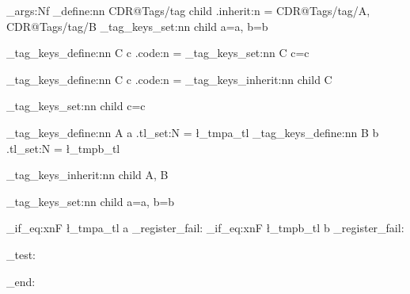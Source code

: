 \exp_args:Nf \keys_define:nn { CDR@Tags/tag } {
  child .inherit:n = { CDR@Tags/tag/A, CDR@Tags/tag/B}
}
\CDR_tag_keys_set:nn { child } { a=a, b=b }

\CDR_tag_keys_define:nn { C } { c .code:n =  }
\CDR_tag_keys_set:nn { C } { c=c }




\CDR_tag_keys_define:nn { C } { c .code:n =  }
\CDR_tag_keys_inherit:nn { child } { C }

\CDR_tag_keys_set:nn { child } { c=c }

\CDR_tag_keys_define:nn { A } { a .tl_set:N = \l_tmpa_tl }
\CDR_tag_keys_define:nn { B } { b .tl_set:N = \l_tmpb_tl }

\CDR_tag_keys_inherit:nn { child } { A, B }

\CDR_tag_keys_set:nn { child } { a=a, b=b }


\tl_if_eq:xnF { \l_tmpa_tl } { a } { \CDR_register_fail: }
\tl_if_eq:xnF { \l_tmpb_tl } { b } { \CDR_register_fail: }

\CDR_test:

\group_end:
\ExplSyntaxOff
